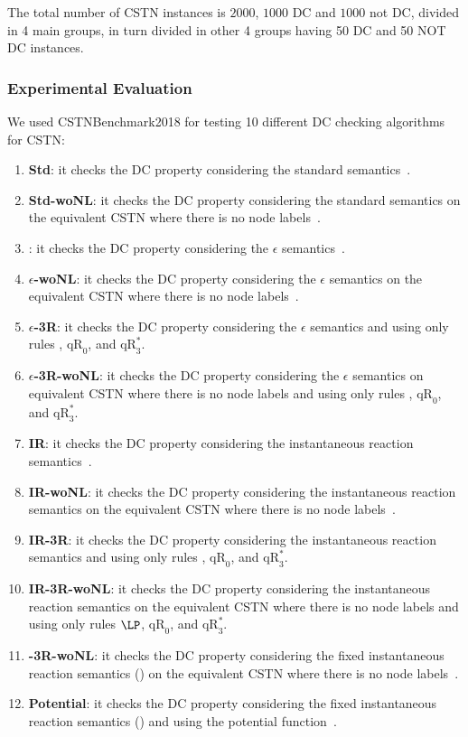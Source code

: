 \documentclass[a4paper,11pt]{article}
\begin{document}
The total number of CSTN instances is $2000$, $1000$ DC and $1000$ not DC, divided in 4 main groups, in turn divided in other 4 groups having 50 DC and 50 NOT DC instances.


\subsubsection{Experimental Evaluation}

We used CSTNBenchmark2018 for testing  10 different DC checking algorithms for CSTN:
\begin{enumerate}
  \item \textbf{Std}: it checks the DC property considering the standard semantics~\cite{HunsbergerP16Icaps}.
  \item \textbf{Std-woNL}: it checks the DC property considering the standard semantics on the equivalent CSTN where there is no node labels~\cite{CairoEtalTime2017}.
  \item \boldmath{$\epsilon$}: it checks the DC property considering the $\epsilon$ semantics~\cite{HunsbergerP16Icaps}. %
  \item \textbf{$\epsilon$-woNL}: it checks the DC property considering the $\epsilon$ semantics on the equivalent CSTN where there is no node labels~\cite{CairoEtalTime2017}.
  \item \textbf{$\epsilon$-3R}: it checks the DC property considering the $\epsilon$ semantics and using only rules \LP, $\mathup{qR}_0$, and $\mathup{qR}_3^*$.
  \item \textbf{$\epsilon$-3R-woNL}: it checks the DC property considering the $\epsilon$ semantics on equivalent CSTN where there is no node labels and using only rules \LP, $\mathup{qR}_0$, and $\mathup{qR}_3^*$.
  \item \textbf{IR}: it checks the DC property considering the instantaneous reaction semantics~\cite{HunsbergerP16Icaps}.
  \item \textbf{IR-woNL}: it checks the DC property considering the instantaneous reaction semantics on the equivalent CSTN where there is no node labels~\cite{CairoEtalTime2017}.
  \item \textbf{IR-3R}: it checks the DC property considering the instantaneous reaction semantics and using only rules \LP, $\mathup{qR}_0$, and $\mathup{qR}_3^*$.
  \item \textbf{IR-3R-woNL}: it checks the DC property considering the instantaneous reaction semantics on the equivalent CSTN where there is no node labels and using only rules $\LP$, $\mathup{qR}_0$, and $\mathup{qR}_3^*$.

  \item \textbf{\textpi-3R-woNL}: it checks the DC property considering the fixed instantaneous reaction semantics (\textpi) on the equivalent CSTN where there is no node labels~\cite{HunsbergerPFixed18}.

  \item \textbf{Potential}: it checks the DC property considering the fixed instantaneous reaction semantics (\textpi) and using the potential function~\cite{HunsbergerP20}.

\end{enumerate}
\end{document}
